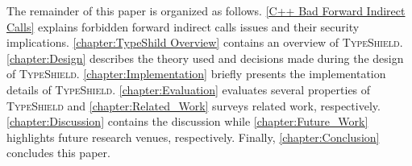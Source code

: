 The remainder of this paper is organized as follows.
\cref{C++ Bad Forward Indirect Calls} explains forbidden forward indirect calls issues and their security implications.
\cref{chapter:TypeShild Overview} contains an overview of \textsc{TypeShield}.
\cref{chapter:Design} describes the theory used and decisions made during the design of \textsc{TypeShield}.
\cref{chapter:Implementation} briefly presents the implementation details of \textsc{TypeShield}.
\cref{chapter:Evaluation} evaluates several properties of \textsc{TypeShield} and
\cref{chapter:Related_Work} surveys related work, respectively.
\cref{chapter:Discussion} contains the discussion while 
\cref{chapter:Future_Work} highlights future research venues, respectively. 
Finally, \cref{chapter:Conclusion} concludes this paper.


